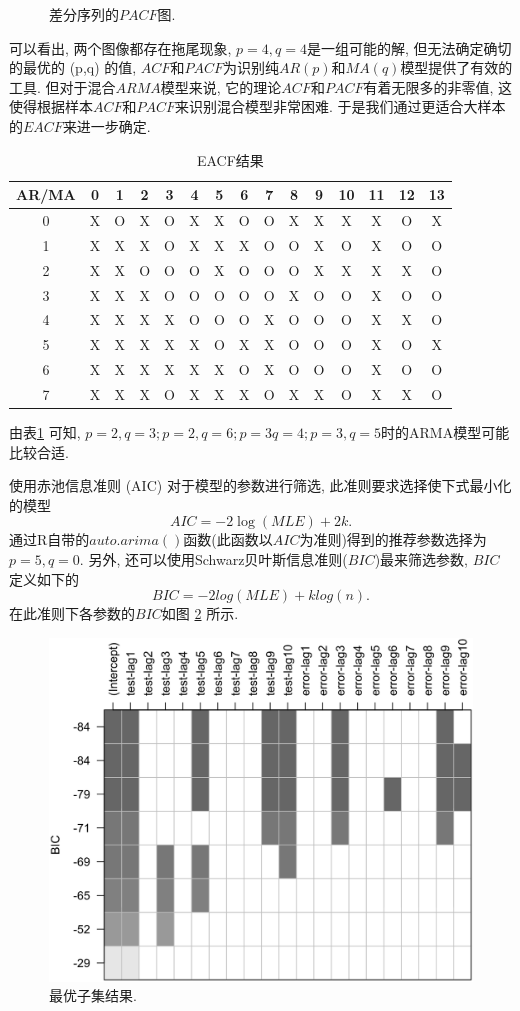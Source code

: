 \documentclass[11pt]{article}
\begin{document}
\begin{center}
\begin{minipage}{0.35\textwidth}
\begin{figure}
            \caption{差分序列的$PACF$图.\label{fig:4}}
        \end{figure}
    \end{minipage}
\end{center}
\qquad 可以看出, 两个图像都存在拖尾现象, $p=4,q=4$是一组可能的解, 但无法确定确切的最优的 (p,q) 的值, $ACF$和$PACF$为识别纯$AR(p)$和$MA(q)$模型提供了有效的工具. 但对于混合$ARMA$模型来说, 它的理论$ACF$和$PACF$有着无限多的非零值, 这使得根据样本$ACF$和$PACF$来识别混合模型非常困难. 于是我们通过更适合大样本的$EACF$来进一步确定.
\begin{longtable}[c]{c|cccccccccccccc}
    \caption{EACF结果}
    \label{tab:my-table}\\
    \hline
    AR/MA & 0 & 1 & 2 & 3 & 4 & 5 & 6 & 7 & 8 & 9 & 10 & 11 & 12 & 13 \\ \hline
    \endfirsthead
    \endhead
    \hline
    \endfoot
    \endlastfoot
    0     & X & O & X & O & X & X & O & O & X & X & X  & X  & O  & X  \\
    1     & X & X & X & O & X & X & X & O & O & X & O  & X  & O  & O  \\
    2     & X & X & O & O & O & X & O & O & O & X & X  & X  & X  & O  \\
    3     & X & X & X & O & O & O & O & O & X & O & O  & X  & O  & O  \\
    4     & X & X & X & X & O & O & O & X & O & O & O  & X  & X  & O  \\
    5     & X & X & X & X & X & O & X & X & O & O & O  & X  & O  & X  \\
    6     & X & X & X & X & X & X & O & X & O & O & O  & X  & O  & O  \\
    7     & X & X & X & O & X & X & X & O & X & X & O  & X  & X  & O  \\ \hline
    \end{longtable}
由表\ref{tab:my-table} 可知, $p=2,q=3;p=2,q=6;p=3 q=4;p=3,q=5$时的ARMA模型可能比较合适. 

\qquad 使用赤池信息准则 (AIC) 对于模型的参数进行筛选, 此准则要求选择使下式最小化的模型\[
    AIC=-2\log(MLE) +2k.
\]
通过R自带的$auto.arima()$函数(此函数以$AIC$为准则)得到的推荐参数选择为$p=5,q=0$. 另外, 还可以使用Schwarz贝叶斯信息准则($BIC$)最来筛选参数, $BIC$定义如下的\[
    BIC= -2log(MLE)+klog(n).
\]
在此准则下各参数的$BIC$如图 \ref{fig:bic} 所示.
\begin{figure}
    \centering
    \includegraphics[width=.4\textwidth]{bic}
    \caption{最优子集结果. \label{fig:bic}}
\end{figure}
\end{document}
